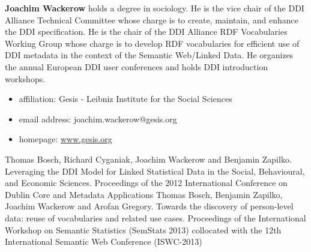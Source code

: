 \documentclass{llncs}
\begin{document}
\textbf{Joachim Wackerow} holds a degree in sociology. 
He is the vice chair of the DDI Alliance Technical Committee whose charge is to create, maintain, and enhance the DDI specification.
He is the chair of the DDI Alliance RDF Vocabularies Working Group whose charge is to develop RDF vocabularies for efficient use of DDI metadata in the context of the Semantic Web/Linked Data.
He organizes the annual European DDI user conferences and holds DDI introduction workshops.

\begin{itemize}
  \item affiliation: Gesis - Leibniz Institute for the Social Sciences
  \item email address: joachim.wackerow@gesis.org
	\item homepage: \url{www.gesis.org}
\end{itemize}

%
\begin{thebibliography}{1}
Thomas Bosch, Richard Cyganiak, Joachim Wackerow and Benjamin Zapilko. Leveraging the {DDI} Model for Linked Statistical Data in the Social, Behavioural, and Economic Sciences. Proceedings of the 2012 International Conference on Dublin Core and 	Metadata Applications
Thomas Bosch, Benjamin Zapilko, Joachim Wackerow and Arofan Gregory. Towards the discovery of person-level data: reuse of vocabularies and related use cases. Proceedings of the International Workshop on Semantic Statistics (SemStats 2013) collocated with the 12th International Semantic Web Conference (ISWC-2013)
\end{thebibliography}
\end{document}
